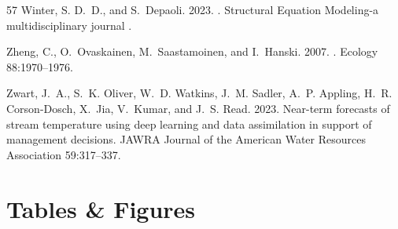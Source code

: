 \documentclass[11pt]{article}
\begin{document}
\begin{thebibliography}{57}
Winter, S. D.~D., and S.~Depaoli. 2023.
.
\newblock Structural Equation Modeling-a multidisciplinary journal .

Zheng, C., O.~Ovaskainen, M.~Saastamoinen, and I.~Hanski. 2007.
.
\newblock Ecology 88:1970--1976.

Zwart, J.~A., S.~K. Oliver, W.~D. Watkins, J.~M. Sadler, A.~P. Appling, H.~R.
  Corson-Dosch, X.~Jia, V.~Kumar, and J.~S. Read. 2023.
\newblock Near-term forecasts of stream temperature using deep learning and
  data assimilation in support of management decisions.
\newblock JAWRA Journal of the American Water Resources Association
  59:317--337.

\end{thebibliography}


\clearpage

\section*{Tables \& Figures}
\end{document}
